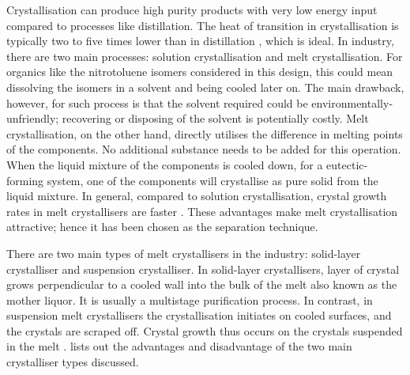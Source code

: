 Crystallisation can produce high purity products with very low energy input compared to processes like distillation. The heat of transition in crystallisation is typically two to five times lower than in distillation \cite{bassett_melt_2021}, which is ideal. In industry, there are two main processes: solution crystallisation and melt crystallisation. For organics like the nitrotoluene isomers considered in this design, this could mean dissolving the isomers in a solvent and being cooled later on. The main drawback, however, for such process is that the solvent required could be environmentally-unfriendly; recovering or disposing of the solvent is potentially costly. Melt crystallisation, on the other hand, directly utilises the difference in melting points of the components. No additional substance needs to be added for this operation. When the liquid mixture of the components is cooled down, for a eutectic-forming system, one of the components will crystallise as pure solid from the liquid mixture. In general, compared to solution crystallisation, crystal growth rates in melt crystallisers are faster \cite{myerson_handbook_2019}. These advantages make melt crystallisation attractive; hence it has been chosen as the separation technique. 


There are two main types of melt crystallisers in the industry: solid-layer crystalliser and suspension crystalliser. In solid-layer crystallisers, layer of crystal grows perpendicular to a cooled wall into the bulk of the melt also known as the mother liquor. It is usually a multistage purification process. In contrast, in suspension melt crystallisers the crystallisation initiates on cooled surfaces, and the crystals are scraped off. Crystal growth thus occurs on the crystals suspended in the melt \cite{myerson_handbook_2019}.  lists out the advantages and disadvantage of the two main crystalliser types discussed. 

